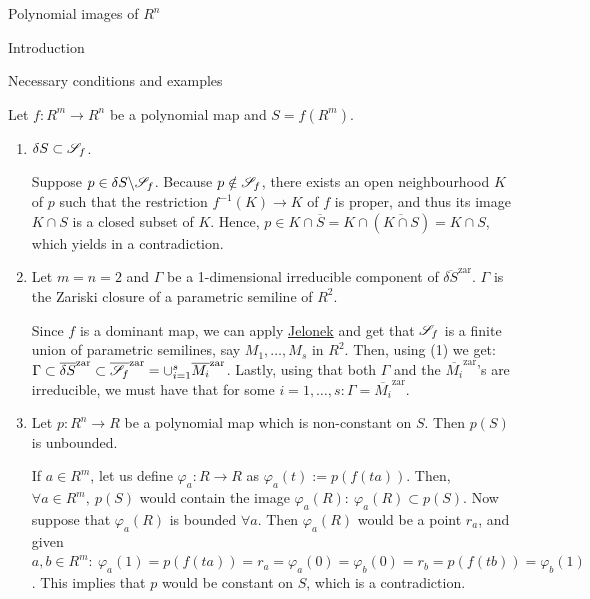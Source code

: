 \documentclass[11pt, a4paper, english, twoside, notitlepage]{report}
\begin{document}
\begin{chapter}{Polynomial images of $R^n$}
\begin{section}{Introduction}
\begin{subsection}{Necessary conditions and examples}
\begin{proposition}
	Let $f: R^m \longrightarrow R^n$ be a polynomial map and $S = f(R^m)$.
		\begin{enumerate}[(1)]
			\item $\delta S \subset \S_f$.
				\begin{Proof}
					Suppose $p \in \delta S \backslash \S_f$. Because $p \notin \S_f$, there exists an open neighbourhood $K$ of $p$ such that the restriction $f^{-1}(K) \rightarrow K$ of $f$ is proper, and thus its image $K \cap S$ is a closed subset of $K$. Hence, $p \in K\cap \overline{S} = K \cap (\overline{K\cap S}) = K \cap S$, which yields in a contradiction.
				\end{Proof}
			
			\item Let $m = n = 2$ and $\Gamma$ be a 1-dimensional irreducible component of $\overline{\delta S}^{\text{zar}}$. $\Gamma$ is the Zariski closure of a parametric semiline of $R^2$.
				\begin{Proof}
					Since $f$ is a dominant map, we can apply \hyperref[jelonek]{Jelonek} and get that $\S_f$ is a finite union of parametric semilines, say $M_1, \dots, M_s$ in $R^2$. Then, using (1) we get: $\Gamma \subset \overline{\delta S}^{\text{zar}} \subset \overline{\S_f}^{\text{zar}} = \cup_{i=1}^s  \overline{M_i}^{\text{zar}}$. Lastly, using that both $\Gamma$ and the $\overline{M_i}^{\text{zar}}$'s are irreducible, we must have that for some $i = 1, \dots, s: \Gamma = \overline{M_i}^{\text{zar}}$.
				\end{Proof}
			
			\item Let $p:R^n \rightarrow R$ be a polynomial map which is non-constant on $S$. Then $p(S)$ is unbounded.
				\begin{Proof}
					If $a \in R^m$, let us define $\varphi_a:R \rightarrow R$ as $\varphi_a(t) := p(f(ta))$. Then, $\forall a \in R^m,\ p(S)$ would contain the image $\varphi_a(R):\ \varphi_a(R) \subset p(S)$. Now suppose that $\varphi_a(R)$ is bounded $\forall a$. Then $\varphi_a(R)$ would be a point $r_a$, and given $a, b \in R^m: \ \varphi_a(1) = p(f(ta)) = r_a = \varphi_a(0) = \varphi_b(0) = r_b = p(f(tb)) = \varphi_b(1)$. This implies that $p$ would be constant on $S$, which is a contradiction.
				\end{Proof}
			
		\end{enumerate}
		
	\end{proposition}	
	

\end{subsection}
\end{section}
\end{chapter}
\end{document}
